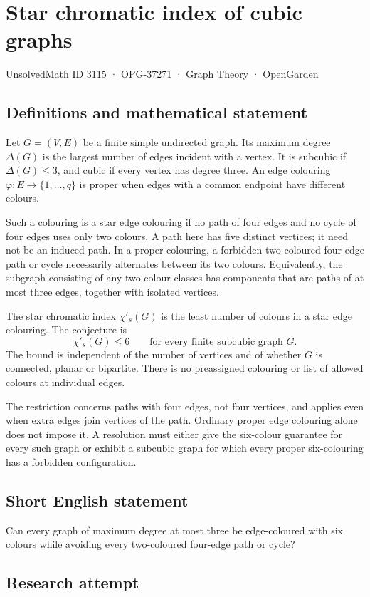 \documentclass[11pt,a4paper]{article}
\begin{document}
\section*{Star chromatic index of cubic graphs}\label{3115}
{\small UnsolvedMath ID 3115 · OPG-37271 · Graph Theory · OpenGarden}
\subsection{Definitions and mathematical statement}
Let $G=(V,E)$ be a finite simple undirected graph. Its maximum degree
$\Delta(G)$ is the largest number of edges incident with a vertex.
It is subcubic if $\Delta(G)\le3$, and cubic if every vertex has degree
three. An edge colouring $\varphi:E\to\{1,\ldots,q\}$ is proper when
edges with a common endpoint have different colours.

Such a colouring is a star edge colouring if no path of four edges and
no cycle of four edges uses only two colours. A path here has five
distinct vertices; it need not be an induced path. In a proper colouring,
a forbidden two-coloured four-edge path or cycle necessarily alternates
between its two colours. Equivalently, the subgraph consisting of any
two colour classes has components that are paths of at most three edges,
together with isolated vertices.

The star chromatic index $\chi'_s(G)$ is the least number of colours
in a star edge colouring. The conjecture is
\[
 \chi'_s(G)\le6\qquad\text{for every finite subcubic graph }G.
\]
The bound is independent of the number of vertices and of whether $G$
is connected, planar or bipartite. There is no preassigned colouring or
list of allowed colours at individual edges.

The restriction concerns paths with four edges, not four vertices, and
applies even when extra edges join vertices of the path. Ordinary proper
edge colouring alone does not impose it. A resolution must either give
the six-colour guarantee for every such graph or exhibit a subcubic
graph for which every proper six-colouring has a forbidden configuration.
\subsection{Short English statement}
Can every graph of maximum degree at most three be edge-coloured with six colours while avoiding every two-coloured four-edge path or cycle?
\subsection{Research attempt}
\end{document}

